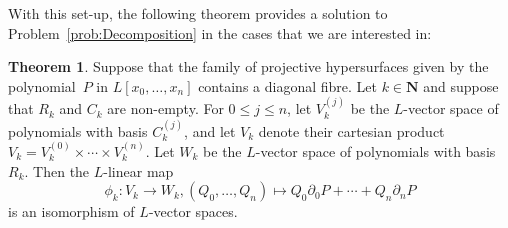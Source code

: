\documentclass[a4paper,11pt]{article}
\numberwithin{equation}{section}
\newcommand{\NN}{\mathbf{N}} %
\renewcommand{\to}{\rightarrow}        %
\theoremstyle{definition}
\newtheorem{thm}{Theorem}[section]
\begin{document}
With this set-up, the following theorem provides a solution to 
Problem~\ref{prob:Decomposition} in the cases that we are interested in:

\begin{thm} \label{thm:Isomorphism}
Suppose that the family of projective hypersurfaces given by the 
polynomial~$P$ in $L[x_0, \dotsc, x_n]$ contains a diagonal fibre.  
Let $k \in \NN$ and suppose that $R_k$ and $C_k$ are non-empty.  For 
$0 \leq j \leq n$, let $V_k^{(j)}$ be the $L$-vector space of 
polynomials with basis $C_k^{(j)}$, and let $V_k$ denote their cartesian 
product $V_k = V_k^{(0)} \times \dotsb \times V_k^{(n)}$.  Let $W_k$ be 
the $L$-vector space of polynomials with basis~$R_k$.  Then the $L$-linear 
map 
\begin{equation}
\phi_k \colon V_k \to W_k, 
(Q_0, \dotsc, Q_n) \mapsto Q_0 \partial_0 P + \dotsb + Q_n \partial_n P
\end{equation}
is an isomorphism of $L$-vector spaces.
\end{thm}
\end{document}
